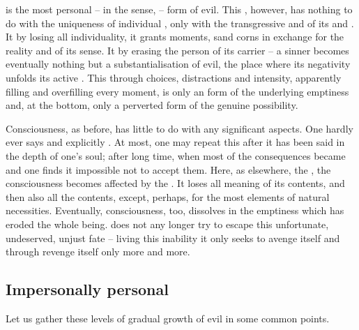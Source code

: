 \pa {} is the most personal -- in the sense,
 -- form of evil. This , however, has
nothing to do with the uniqueness of individual , only with the
transgressive and   of its  and . It
 by losing all individuality, it grants 
moments,  sand corns in exchange for the  reality and
 of its sense. It  by erasing the person of its
carrier -- a sinner becomes eventually nothing but a {substantialisation} of evil,
the place where its negativity unfolds its active . 
This  through  choices, distractions and
intensity, apparently filling and overfilling every moment, is only an
 form of the underlying emptiness and, at the bottom, only a  
perverted form of the genuine  possibility. 

Consciousness, as before, has little to do with any significant aspects.  One
hardly ever says  and explicitly .
At most, one may  repeat this after it has been said in the depth
of one's soul; after long time, when most of the consequences became
 and one finds it impossible not to accept them. Here, as elsewhere,
the , the  consciousness becomes affected by
the . It loses all meaning of its contents, and then also all the
contents, except, perhaps, for the most  elements of natural
necessities. Eventually, consciousness, too, dissolves in the emptiness which
has eroded the whole being.   does not any longer try to
escape this unfortunate, undeserved, unjust fate -- living this inability it
only seeks to avenge itself and through revenge  itself only more
and more.



\subsection{Impersonally personal}
Let us gather these levels of gradual growth of evil in some common points. 


